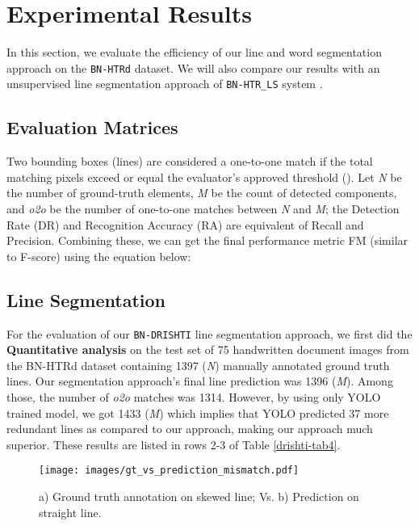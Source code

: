 \documentclass[runningheads]{llncs}
\begin{document}
\section{Experimental Results}
\vspace{-2mm}
In this section, we evaluate the efficiency of our line and word segmentation approach on the \texttt{BN-HTRd} dataset. We will also compare our results with an unsupervised line segmentation approach of \texttt{BN-HTR\_LS} system \cite{rahman2023bn}. 

\vspace{-2mm}
\subsection{Evaluation Matrices}
Two bounding boxes (lines) are considered a one-to-one match if the total matching pixels exceed or equal the evaluator's approved threshold (). Let \textit{N} be the number of ground-truth elements, \textit{M} be the count of detected components, and \textit{o2o} be the number of one-to-one matches between \textit{N} and \textit{M}; the Detection Rate (DR) and Recognition Accuracy (RA) are equivalent of Recall and Precision. Combining these, we can get the final performance metric FM (similar to F-score) using the equation below:



\vspace{-2mm}
\subsection{Line Segmentation}

For the evaluation of our \texttt{BN-DRISHTI} line segmentation approach, we first did the \textbf{Quantitative analysis} on the test set of 75 handwritten document images from the BN-HTRd dataset containing 1397 (\textit{N}) manually annotated ground truth lines. Our segmentation approach's final line prediction was 1396 (\textit{M}). Among those, the number of \textit{o2o} matches was 1314. However, by using only YOLO trained model, we got 1433 (\textit{M}) which implies that YOLO predicted 37 more redundant lines as compared to our approach, making our approach much superior. These results are listed in rows 2-3 of Table \ref{drishti-tab4}.

\begin{figure}[h]
\vspace{-4mm}
    \centering
    \texttt{[image: images/gt\_vs\_prediction\_mismatch.pdf]}
    \vspace{-4mm}
    \caption{a) Ground truth annotation on skewed line; Vs. b) Prediction on straight line.}
    \label{drishti-fig14}
    \vspace{-5mm}
\end{figure}
\end{document}
